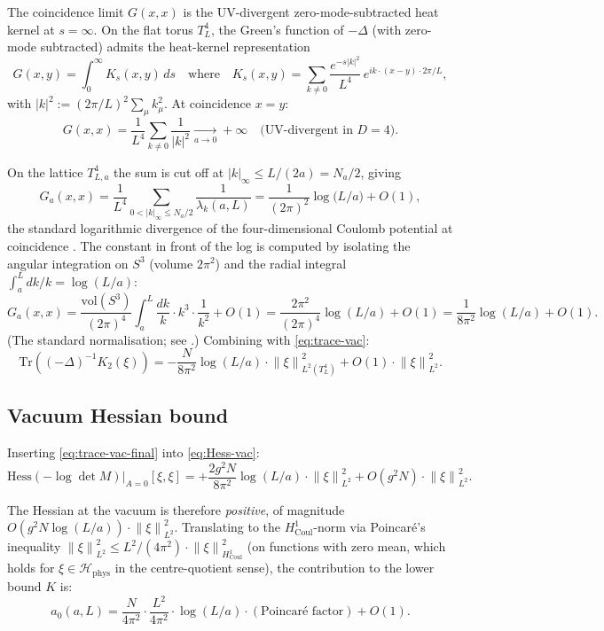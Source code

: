 \documentclass[11pt,a4paper]{amsart}
\theoremstyle{definition}
\newcommand{\norm}[1]{\left\lVert#1\right\rVert}
\newcommand{\Tr}{\mathrm{Tr}}
\newcommand{\Coul}{\mathrm{Coul}}
\newcommand{\Hess}{\mathrm{Hess}}
\begin{document}
The coincidence limit $G(x, x)$ is the UV-divergent zero-mode-subtracted
heat kernel at $s = \infty$. On the flat torus $T^4_L$, the Green's function
of $-\Delta$ (with zero-mode subtracted) admits the heat-kernel representation
\[
G(x, y) = \int_0^\infty K_s(x, y)\, ds
\quad \text{where} \quad
K_s(x, y) = \sum_{k \neq 0} \frac{e^{-s|k|^2}}{L^4} \, e^{i k \cdot (x-y) \cdot 2\pi/L},
\]
with $|k|^2 := (2\pi/L)^2 \sum_\mu k_\mu^2$. At coincidence $x = y$:
\[
G(x, x) = \frac{1}{L^4} \sum_{k \neq 0} \frac{1}{|k|^2}
\xrightarrow[a \to 0]{} +\infty
\quad \text{(UV-divergent in $D = 4$).}
\]

On the lattice $T^4_{L, a}$ the sum is cut off at $|k|_\infty \leq L/(2a) = N_a/2$,
giving
\begin{equation}\label{eq:G-coincidence}
G_a(x, x) = \frac{1}{L^4} \sum_{0 < |k|_\infty \leq N_a/2} \frac{1}{\lambda_k(a, L)}
= \frac{1}{(2\pi)^2} \log\bigl(L/a\bigr) + O(1),
\end{equation}
the standard logarithmic divergence of the four-dimensional Coulomb potential
at coincidence \cite[\S 2.4]{Smit2002}. The constant in front of the log
is computed by isolating the angular integration on $S^3$ (volume $2\pi^2$)
and the radial integral $\int_a^L dk/k = \log(L/a)$:
\[
G_a(x, x) = \frac{\mathrm{vol}(S^3)}{(2\pi)^4} \int_a^L \frac{dk}{k} \cdot k^3 \cdot \frac{1}{k^2}
+ O(1)
= \frac{2\pi^2}{(2\pi)^4} \log(L/a) + O(1)
= \frac{1}{8\pi^2} \log(L/a) + O(1).
\]
(The standard normalisation; see \cite[Eq.~(2.71)]{Smit2002}.) Combining with
\eqref{eq:trace-vac}:
\begin{equation}\label{eq:trace-vac-final}
\Tr((-\Delta)^{-1} K_2(\xi)) = -\frac{N}{8\pi^2} \log(L/a) \cdot \norm{\xi}^2_{L^2(T^4_L)} + O(1) \cdot \norm{\xi}^2_{L^2}.
\end{equation}

\subsection{Vacuum Hessian bound}

Inserting \eqref{eq:trace-vac-final} into \eqref{eq:Hess-vac}:
\begin{equation}\label{eq:Hess-vac-bound}
\Hess(-\log\det M)|_{A=0}[\xi, \xi] = +\frac{2 g^2 N}{8 \pi^2} \log(L/a) \cdot \norm{\xi}^2_{L^2} + O(g^2 N)\cdot\norm{\xi}^2_{L^2}.
\end{equation}

The Hessian at the vacuum is therefore \emph{positive}, of magnitude
$O(g^2 N \log(L/a)) \cdot \norm{\xi}^2_{L^2}$. Translating to the
$H^1_{\Coul}$-norm via Poincar\'e's inequality $\norm{\xi}^2_{L^2} \leq L^2/(4\pi^2)
\cdot \norm{\xi}^2_{H^1_{\Coul}}$ (on functions with zero mean, which holds for
$\xi \in \mathcal H_{\mathrm{phys}}$ in the centre-quotient sense), the
contribution to the lower bound $K$ is:
\begin{equation}\label{eq:a0-formula}
a_0(a, L) = \frac{N}{4\pi^2} \cdot \frac{L^2}{4 \pi^2} \cdot \log(L/a) \cdot (\text{Poincar\'e factor}) + O(1).
\end{equation}
\end{document}
